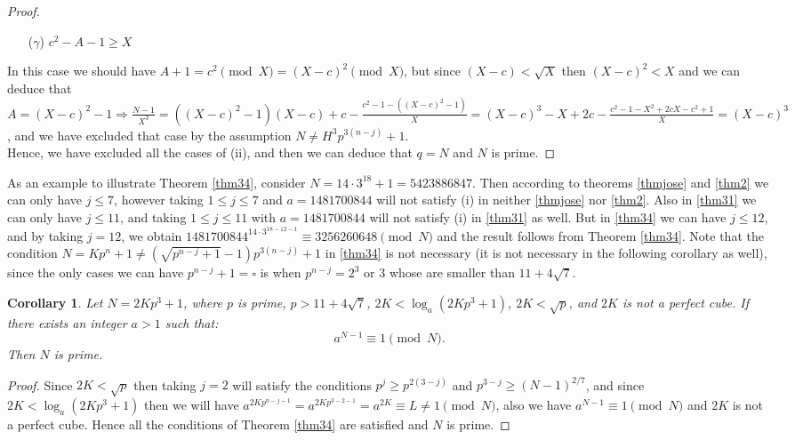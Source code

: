\documentclass{amsart}
\newtheorem{corollary}[theorem]{Corollary}
\numberwithin{equation}{section}
\begin{document}
\begin{proof}
	\begin{enumerate}
		\item[($\gamma$)] $c^2-A-1 \ge X$
	\end{enumerate}
	In this case we should have $A+1=c^2 \pmod X = (X-c)^2 \pmod X$, but since $(X-c) < \sqrt{X}$ then $(X-c)^2 < X$ and we can deduce that $A=(X-c)^2-1 \Longrightarrow \frac{N-1}{X^3}= ((X-c)^2-1)(X-c) + c -\frac{c^2 -1 -((X-c)^2-1)}{X} = (X-c)^3 -X +2c - \frac{c^2 -1 -X^2 +2cX -c^2 +1}{X}= (X-c)^3$, and we have excluded that case by the assumption $N \neq H^3 p^{3(n-j)}+1$. 
	\\
	Hence, we have excluded all the cases of (ii), and then we can deduce that $q=N$ and $N$ is prime.
\end{proof}

As an example to illustrate Theorem \ref{thm34}, consider $N=14\cdot 3^{18}+1=5423886847$. Then according to theorems \ref{thmjose} and \ref{thm2} we can only have $j \leq 7$, however taking $1 \le j \le 7$ and $a=1481700844$ will not satisfy (i) in neither \ref{thmjose} nor \ref{thm2}. Also in \ref{thm31} we can only have $j \leq 11$, and taking $1 \le j \le 11$ with $a=1481700844$ will not satisfy (i) in \ref{thm31} as well. But in \ref{thm34} we can have $j \leq 12$, and by taking $j=12$, we obtain $1481700844^{14\cdot 3^{18-12-1}}\equiv 3256260648 \pmod N$ and the result follows from Theorem \ref{thm34}. Note that the condition $N=Kp^n+1 \neq (\sqrt{p^{n-j}+1}-1)p^{3(n-j)}+1$ in \ref{thm34} is not necessary (it is not necessary in the following corollary as well), since the only cases we can have $p^{n-j}+1=\square$ is when $p^{n-j}=2^3$ or $3$ whose are smaller than $11+4 \sqrt{7}$. 

\begin{corollary}\label{cor35}
	Let $N=2Kp^3+1$,  where $p$ is prime, $p>11+4 \sqrt{7}$, $2K < \log_{a}(2Kp^3+1)$, $2K < \sqrt{p}$, and $2K$ is not a perfect cube. If there exists an integer $a>1$ such that:
	\begin{equation}
		a^{N-1} \equiv 1 \pmod N.
	\end{equation}
	Then $N$ is prime.
\end{corollary}

\begin{proof}
	Since $2K < \sqrt{p}$ then taking $j=2$ will satisfy the conditions $p^j \ge p^{2(3-j)} $ and $p^{3-j} \ge (N-1)^{2/7}$, and since $2K < \log_{a}(2Kp^3+1)$ then we will have $a^{2Kp^{n-j-1}}=a^{2Kp^{3-2-1}}=a^{2K}  \equiv L \neq 1 \pmod N$, also we have $a^{N-1} \equiv 1 \pmod N$ and $2K$ is not a perfect cube. Hence all the conditions of Theorem \ref{thm34} are satisfied and $N$ is prime.
\end{proof}
\end{document}
